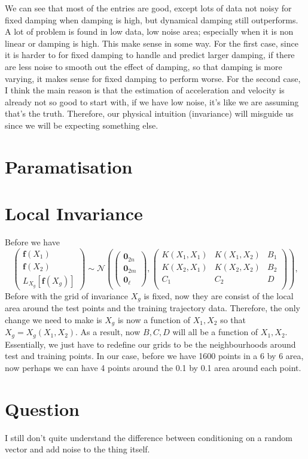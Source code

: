 \documentclass{article}
\begin{document}
We can see that most of the entries are good, except lots of data not noisy for fixed damping when damping is high, but dynamical damping still outperforms.
A lot of problem is found in low data, low noise area; especially when it is non linear or damping is high. 
This make sense in some way.
For the first case, since it is harder to for fixed damping to handle and predict larger damping, if there are less noise to smooth out the effect of damping, so that damping is more varying, it makes sense for fixed damping to perform worse. 
For the second case, I think the main reason is that the estimation of acceleration and velocity is already not so good to start with, if we have low noise, it's like we are assuming that's the truth.
Therefore, our physical intuition (invariance) will misguide us since we will be expecting something else. 
\section*{Paramatisation}
\section*{Local Invariance}
Before we have
$$
\begin{pmatrix}
  \mathbf{f}(X_1)\\\mathbf{f}(X_2) \\ L_{X_g}[\mathbf{f}(X_g)]
\end{pmatrix}
\sim \mathcal{N}
\left(
\begin{pmatrix}
  \mathbf{0}_{2n} \\ \mathbf{0}_{2m} \\ \mathbf{0}_{\ell}
\end{pmatrix},
\begin{pmatrix}
K(X_1, X_1) & K(X_1, X_2) & B_1 \\
K(X_2, X_1) & K(X_2, X_2) & B_2 \\
C_1         & C_2         & D \\
\end{pmatrix}
\right), 
$$
Before with the grid of invariance $X_g$ is fixed, now they are consist of the local area around the test points and the training trajectory data. 
Therefore, the only change we need to make is $X_g$ is now a function of $X_1, X_2$ so that $X_g = X_g(X_1, X_2)$.
As a result, now $B, C, D$ will all be a function of $X_1, X_2.$
Essentially, we just have to redefine our grids to be the neighbourhoods around test and training points.  
In our case, before we have 1600 points in a 6 by 6 area, now perhaps we can have 4 points around the 0.1 by 0.1 area around each point. 

\section*{Question}
I still don't quite understand the difference between conditioning on a random vector and add noise to the thing itself.
\end{document}
